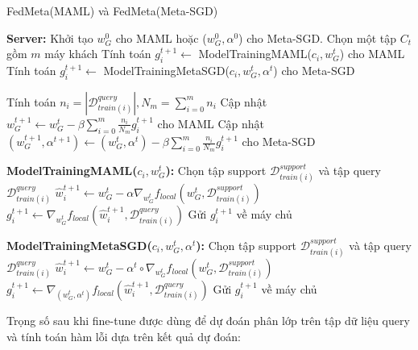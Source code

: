 \begin{algorithm}[H]
    \caption{FedMeta(MAML) và FedMeta(Meta-SGD) \cite{chen2018federated}} \label{alg:fedmeta}
    \begin{algorithmic}[1]
        \State \textbf{Server:}
        \State Khởi tạo $w_G^0$ cho MAML hoặc ($w_G^0, \alpha^0$) cho Meta-SGD.
            \State Chọn một tập $C_t$ gồm $m$ máy khách
                \State Tính toán $g_i^{t+1} \gets$ ModelTrainingMAML($c_i, w_G^t$) cho MAML
                \State Tính toán $g_i^{t+1} \gets$ ModelTrainingMetaSGD($c_i, w_G^t, \alpha^t$) cho Meta-SGD
            \EndFor

            \State

            \State Tính toán {$n_i = \left| \mathcal{D}_{train(i)}^{query} \right|, N_m = \sum_{i=0}^m n_i$}
            \State Cập nhật $w_G^{t+1} \gets w_G^t - \beta \sum_{i=0}^m \frac{n_i}{N_m} g_i^{t+1}$ cho MAML
            \State Cập nhật $(w_G^{t+1}, \alpha^{t+1}) \gets (w_G^t, \alpha^t) - \beta \sum_{i=0}^m \frac{n_i}{N_m} g_i^{t+1}$ cho Meta-SGD
        \EndFor

        \Statex

        \State\textbf{ModelTrainingMAML($c_i, w_G^t$):} 
        \State Chọn tập support $\mathcal{D}_{train(i)}^{support}$ và tập query $\mathcal{D}_{train(i)}^{query}$
        \State $\hat{w}_i^{t+1} \gets w_G^t - \alpha\nabla_{w_G^t} f_{local}(w_G^t, \mathcal{D}_{train(i)}^{support})$
        \State $g_i^{t+1} \gets \nabla_{w_G^t} f_{local}(\hat{w}_i^{t+1}, \mathcal{D}_{train(i)}^{query})$
        \State Gửi $g_i^{t+1}$ về máy chủ

        \Statex

        \State\textbf{ModelTrainingMetaSGD($c_i, w_G^t, \alpha^t$):} 
        \State Chọn tập support $\mathcal{D}_{train(i)}^{support}$ và tập query $\mathcal{D}_{train(i)}^{query}$
        \State $\hat{w}_i^{t+1} \gets w_G^t - \alpha^t \circ \nabla_{w_G^t} f_{local}(w_G^t, \mathcal{D}_{train(i)}^{support})$
        \State $g_i^{t+1} \gets \nabla_{(w_G^t,\alpha^t)} f_{local}(\hat{w}_i^{t+1}, \mathcal{D}_{train(i)}^{query})$
        \State Gửi $g_i^{t+1}$ về máy chủ
    \end{algorithmic}
\end{algorithm}

Trọng số sau khi fine-tune được dùng để dự đoán phân lớp trên tập dữ liệu query và tính toán hàm lỗi dựa trên kết quả dự đoán:

